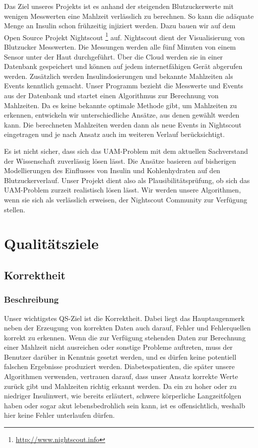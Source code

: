 \documentclass[accentcolor=tud0b,12pt,paper=a4]{tudreport}
\begin{document}
Das Ziel unseres Projekts ist es anhand der steigenden Blutzuckerwerte mit wenigen Messwerten eine Mahlzeit verlässlich zu berechnen. So kann die adäquate Menge an Insulin schon frühzeitig injiziert werden. Dazu bauen wir auf dem Open Source Projekt Nightscout \footnote{\url{http://www.nightscout.info}} auf. Nightscout dient der Visualisierung von Blutzucker Messwerten. Die Messungen werden alle fünf Minuten von einem Sensor unter der Haut durchgeführt. Über die Cloud werden sie in einer Datenbank gespeichert und können auf jedem internetfähigen Gerät abgerufen werden. Zusätzlich werden Insulindosierungen und bekannte Mahlzeiten als Events kenntlich gemacht. Unser Programm bezieht die Messwerte und Events aus der Datenbank und startet einen Algorithmus zur Berechnung von Mahlzeiten. Da es keine bekannte optimale Methode gibt, um Mahlzeiten zu erkennen, entwickeln wir unterschiedliche Ansätze, aus denen gewählt werden kann.  Die berechneten Mahlzeiten werden dann als neue Events in Nightscout eingetragen und je nach Ansatz auch im weiteren Verlauf berücksichtigt.

Es ist nicht sicher, dass sich das UAM-Problem mit dem aktuellen Sachverstand der Wissenschaft zuverlässig lösen lässt. Die Ansätze basieren auf bisherigen Modellierungen des Einflusses von Insulin und Kohlenhydraten auf den Blutzuckerverlauf. Unser Projekt dient also als Plausibilitätsprüfung, ob sich das UAM-Problem zurzeit realistisch lösen lässt.
Wir werden unsere Algorithmen, wenn sie sich als verlässlich erweisen, der Nightscout Community zur Verfügung stellen.


	\chapter{Qualitätsziele}
    \section{Korrektheit}
    
	\subsection{Beschreibung}
Unser wichtigstes QS-Ziel ist die Korrektheit. Dabei liegt das Hauptaugenmerk neben der Erzeugung von korrekten Daten auch darauf, Fehler und Fehlerquellen korrekt zu erkennen. Wenn die zur Verfügung stehenden Daten zur Berechnung einer Mahlzeit nicht ausreichen oder sonstige Probleme auftreten, muss der Benutzer darüber in Kenntnis gesetzt werden, und es dürfen keine potentiell falschen Ergebnisse produziert werden. Diabetespatienten, die später unsere Algorithmen verwenden, vertrauen darauf, dass unser Ansatz korrekte Werte zurück gibt und Mahlzeiten richtig erkannt werden. Da ein zu hoher oder zu niedriger Insulinwert, wie bereits erläutert, schwere körperliche Langzeitfolgen haben oder sogar akut lebensbedrohlich sein kann, ist es offensichtlich, weshalb hier keine Fehler unterlaufen dürfen.
\end{document}
